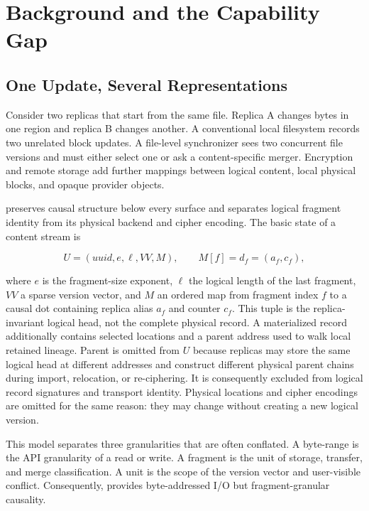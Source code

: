 \section{Background and the Capability Gap}
\label{sec:background}

\subsection{One Update, Several Representations}

Consider two replicas that start from the same file.  Replica A changes bytes
in one region and replica B changes another.  A conventional local filesystem
records two unrelated block updates.  A file-level synchronizer sees two
concurrent file versions and must either select one or ask a content-specific
merger.  Encryption and remote storage add further mappings between logical
content, local physical blocks, and opaque provider objects.

\sfs{} preserves causal structure below every surface and separates logical
fragment identity from its physical backend and cipher encoding.  The basic
state of a content stream is

\begin{equation}
  U = (\mathit{uuid}, e, \ell, VV, M), \qquad
  M[f] = d_f = (a_f,c_f),
\end{equation}

where $e$ is the fragment-size exponent, $\ell$ the logical length of the last
fragment, $VV$ a sparse version vector, and $M$ an ordered map from fragment
index $f$ to a causal dot containing replica alias $a_f$ and counter $c_f$.
This tuple is the replica-invariant logical head, not the complete physical
record.  A materialized record additionally contains selected locations and a
parent address used to walk local retained lineage.  Parent is omitted from
$U$ because replicas may store the same logical head at different addresses
and construct different physical parent chains during import, relocation, or
re-ciphering.  It is consequently excluded from logical record signatures and
transport identity.  Physical locations and cipher encodings are omitted for
the same reason: they may change without creating a new logical version.

This model separates three granularities that are often conflated.  A
byte-range is the API granularity of a read or write.  A fragment is the unit of
storage, transfer, and merge classification.  A unit is the scope of the
version vector and user-visible conflict.  Consequently, \sfs{} provides
byte-addressed I/O but fragment-granular causality.

